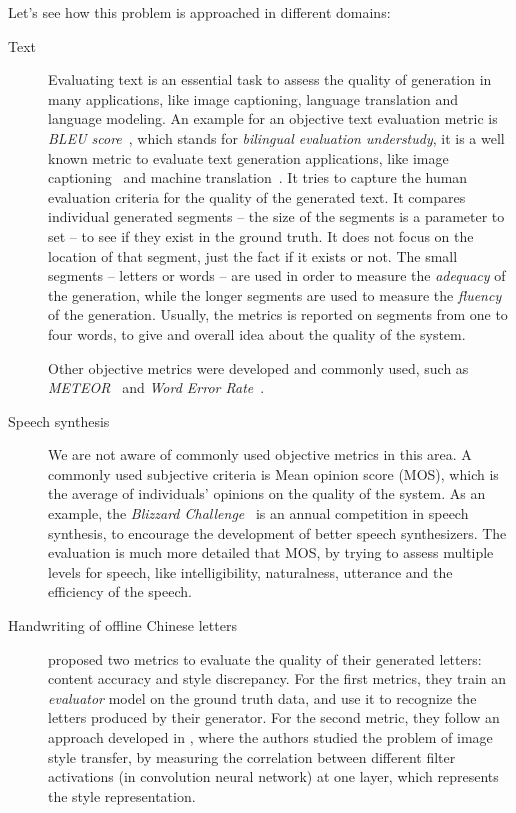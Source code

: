   \par Let's see how this problem is approached in different domains:
  \begin{description}
    \item [Text] Evaluating text is an essential task to assess the quality of generation in many applications, like image captioning, language translation and language modeling. An example for an objective text evaluation metric is \textit{BLEU score}~\citep{papineni2002bleu}, which stands for \textit{bilingual evaluation understudy}, it is a well known metric to evaluate text generation applications, like image captioning~\citep{karpathy2015deep,vinyals2015show} and machine translation~\citep{Sutskever:2014:SSL:2969033.2969173}. It tries to capture the human evaluation criteria for the quality of the generated text. It compares individual generated segments -- the size of the segments is a parameter to set -- to see if they exist in the ground truth. It does not focus on the location of that segment, just the fact if it exists or not. The small segments -- letters or words -- are used in order to measure the \textit{adequacy} of the generation, while the longer segments are used to measure the \textit{fluency} of the generation. Usually, the metrics is reported on segments from one to four words, to give and overall idea about the quality of the system.

    Other objective metrics were developed and commonly used, such as \textit{METEOR}~\citep{denkowski:lavie:meteor-wmt:2014} and \textit{Word Error Rate}~\citep{klakow2002testing}.

    \item [Speech synthesis] We are not aware of commonly used objective metrics in this area. A commonly used subjective criteria is Mean opinion score (MOS), which is the average of individuals' opinions on the quality of the system. As an example, the \textit{Blizzard Challenge}~\citep{blizzard} is an annual competition in speech synthesis, to encourage the development of better speech synthesizers. The evaluation is much more detailed that MOS, by trying to assess multiple levels for speech, like intelligibility, naturalness, utterance and the efficiency of the speech.

    \item [Handwriting of offline Chinese letters] \cite{DBLP:journals/corr/abs-1801-08624} proposed two metrics to evaluate the quality of their generated letters: content accuracy and style discrepancy. For the first metrics, they train an \textit{evaluator} model on the ground truth data, and use it to recognize the letters produced by their generator. For the second metric, they follow an approach developed in \cite{DBLP:journals/corr/GatysEB15}, where the authors studied the problem of image style transfer, by measuring the correlation between different filter activations (in convolution neural network) at one layer, which represents the style representation.
  \end{description}

